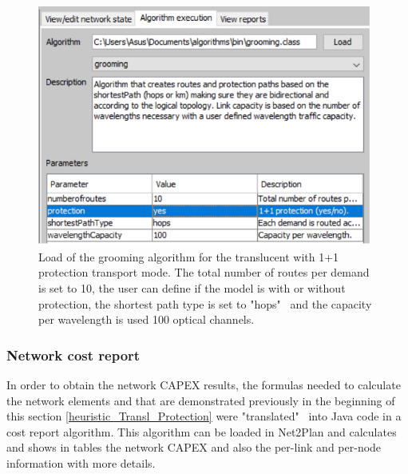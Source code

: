 \begin{figure}[H]
\centering
\includegraphics[width=11cm]{sdf/heuristic/translucent_protection/figures/grooming_translucent_protec6}
\caption{Load of the grooming algorithm for the translucent with 1+1 protection transport mode. The total number of routes per demand is set to 10, the user can define if the model is with or without protection, the shortest path type is set to "hops" \ and the capacity per wavelength is used 100 optical channels.}
\label{grooming_translucent_protec6}
\end{figure}

\subsubsection{Network cost report}

\vspace{11pt}
In order to obtain the network CAPEX results, the formulas needed to calculate the network elements and that are demonstrated previously in the beginning of this section \ref{heuristic_Transl_Protection} were "translated" \ into Java code in a cost report algorithm. This algorithm can be loaded in Net2Plan and calculates and shows in tables the network CAPEX and also the per-link and per-node information with more details.

